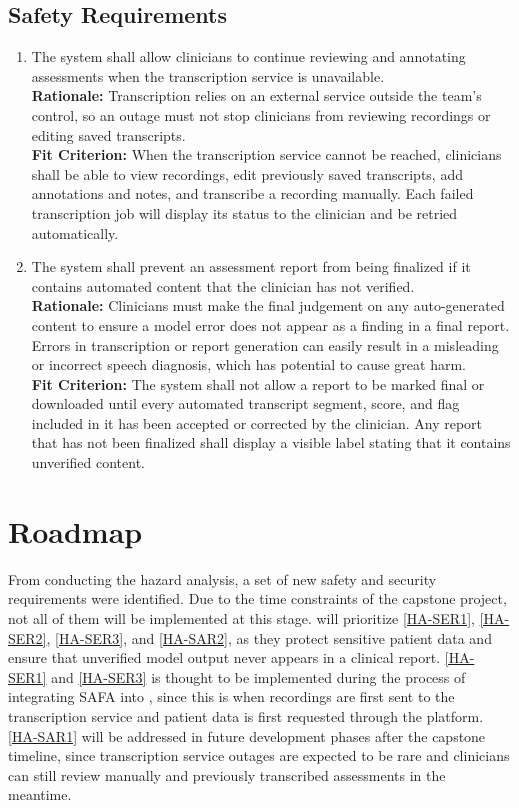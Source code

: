 \documentclass{article}
\begin{document}
\subsection{Safety Requirements}
\begin{enumerate}[label={HA-SAR\arabic*.}, ref={HA-SAR\arabic*}, leftmargin=*]
    \item \label{HA-SAR1} The system shall allow clinicians to continue reviewing and annotating assessments when the transcription service is unavailable.\\
    \textbf{Rationale:} Transcription relies on an external service outside the team's control, so an outage must not stop clinicians from reviewing recordings or editing saved transcripts.\\
    \textbf{Fit Criterion:} When the transcription service cannot be reached, clinicians shall be able to view recordings, edit previously saved transcripts, add annotations and notes, and transcribe a recording manually. Each failed transcription job will display its status to the clinician and be retried automatically.

    \item \label{HA-SAR2} The system shall prevent an assessment report from being finalized if it contains automated content that the clinician has not verified.\\
    \textbf{Rationale:} Clinicians must make the final judgement on any auto-generated content to ensure a model error does not appear as a finding in a final report. Errors in transcription or report generation can easily result in a misleading or incorrect speech diagnosis, which has potential to cause great harm.\\
    \textbf{Fit Criterion:} The system shall not allow a report to be marked final or downloaded until every automated transcript segment, score, and flag included in it has been accepted or corrected by the clinician. Any report that has not been finalized shall display a visible label stating that it contains unverified content.
\end{enumerate}


\section{Roadmap} \label{sec:Roadmap}

From conducting the hazard analysis, a set of new safety and security requirements
were identified. Due to the time constraints of the capstone project, not all of
them will be implemented at this stage. \progname{} will prioritize
\ref{HA-SER1}, \ref{HA-SER2}, \ref{HA-SER3}, and \ref{HA-SAR2}, as they protect
sensitive patient data and ensure that unverified model output never appears in a
clinical report. \ref{HA-SER1} and \ref{HA-SER3} is thought to be implemented during the process of
integrating SAFA into \progname{}, since this is when recordings are first sent to the
transcription service and patient data is first requested through the platform. \ref{HA-SAR1} will be addressed in
future development phases after the capstone timeline, since transcription service
outages are expected to be rare and clinicians can still review manually and previously
transcribed assessments in the meantime.
\end{document}
